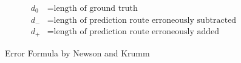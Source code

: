 \documentclass{article}
\numberwithin{equation}{section}
\theoremstyle{definition}
\begin{document}
\begin{figure}[ht]
    \centering
    \def\svgwidth{\linewidth}
    
    \begin{align*}
	    d_0 &= \text{length of ground truth}\\
	    d_- &= \text{length of prediction route erroneously subtracted}\\
	    d_{+} &= \text{length of prediction route erroneously added}
    \end{align*}
    \caption{Error Formula by Newson and Krumm}
    \label{fig:error-formula}
\end{figure}




\end{document}

